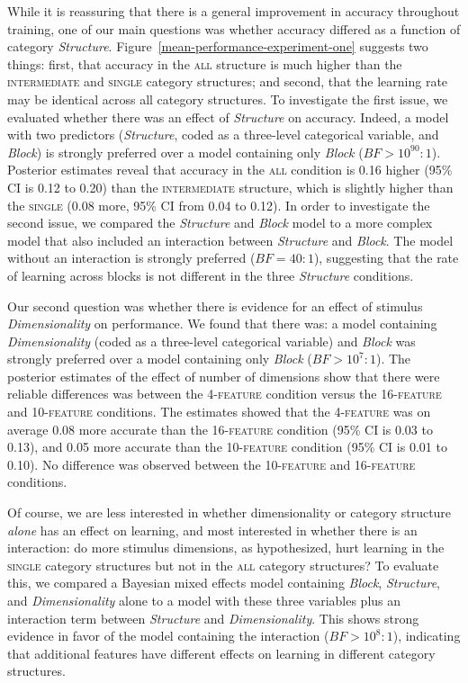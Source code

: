 \documentclass[a4paper, doc, floatsintext]{apa6}
\begin{document}
While it is reassuring that there is a general improvement in accuracy throughout training, one of our main questions was whether accuracy differed as a function of category \textit{Structure}. Figure~\ref{mean-performance-experiment-one} suggests two things: first, that accuracy in the \textsc{all} structure is much higher than the \textsc{intermediate} and \textsc{single} category structures; and second, that the learning rate may be identical across all category structures. To investigate the first issue, we evaluated whether there was an effect of \textit{Structure} on accuracy. Indeed, a model with two predictors (\textit{Structure}, coded as a three-level categorical variable, and \textit{Block}) is strongly preferred over a model containing only \textit{Block} ($BF > 10^{90} : 1$). Posterior estimates reveal that accuracy in the \textsc{all} condition is 0.16 higher (95\% CI is 0.12 to 0.20) than the \textsc{intermediate} structure, which is slightly higher than the \textsc{single} (0.08 more, 95\% CI from 0.04 to 0.12). In order to investigate the second issue, we compared the \textit{Structure} and \textit{Block} model to a more complex model that also included an interaction between \textit{Structure} and \textit{Block}. The model without an interaction is strongly preferred ($BF = 40 : 1$), suggesting that the rate of learning across blocks is not different in the three \textit{Structure} conditions.

Our second question was whether there is evidence for an effect of stimulus \textit{Dimensionality} on performance. We found that there was: a model containing \textit{Dimensionality} (coded as a three-level categorical variable) and \textit{Block} was strongly preferred over a model containing only \textit{Block} ($BF > 10^{7} : 1$). The posterior estimates of the effect of number of dimensions show that there were reliable differences was between the 4-\textsc{feature} condition versus the 16-\textsc{feature} and 10-\textsc{feature} conditions. The estimates showed that the 4-\textsc{feature} was on average 0.08 more accurate than the 16-\textsc{feature} condition (95\% CI is 0.03 to 0.13), and 0.05 more accurate than the 10-\textsc{feature} condition (95\% CI is 0.01 to 0.10). No difference was observed between the 10-\textsc{feature} and 16-\textsc{feature} conditions.

Of course, we are less interested in whether dimensionality or category structure \textit{alone} has an effect on learning, and most interested in whether there is an interaction: do more stimulus dimensions, as hypothesized, hurt learning in the \textsc{single} category structures but not in the \textsc{all} category structures? To evaluate this, we compared a Bayesian mixed effects model containing \textit{Block}, \textit{Structure}, and \textit{Dimensionality} alone to a model with these three variables plus an interaction term between \textit{Structure} and \textit{Dimensionality}. This shows strong evidence in favor of the model containing the interaction ($BF > 10^{8} : 1$), indicating that additional features have different effects on learning in different category structures.
\end{document}
